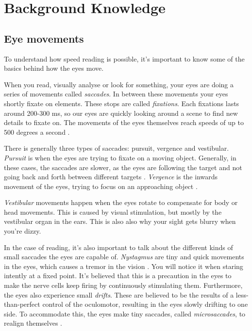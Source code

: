 \section{\fontsize{12}{15}\selectfont Background Knowledge}

\subsection{Eye movements}\label{eye}
To understand how speed reading is possible, it's important to know some of the basics behind how the eyes move.

When you read, visually analyse or look for something, your eyes are doing a series of movements called \textit{saccades}. In between these movements your eyes shortly fixate on elements. These stops are called \textit{fixations}. Each fixations lasts around 200-300 ms, so our eyes are quickly looking around a scene to find new details to fixate on. The movements of the eyes themselves reach speeds of up to 500 degrees a second \cite{eyeMovement}.

There is generally three types of saccades: pursuit, vergence and vestibular. \textit{Pursuit} is when the eyes are trying to fixate on a moving object. Generally, in these cases, the saccades are slower, as the eyes are following the target and not going back and forth between different targets \cite{eyeMovement}.
\textit{Vergence} is the inwards movement of the eyes, trying to focus on an approaching object \cite{eyeMovement}.

\textit{Vestibular} movements happen when the eyes rotate to compensate for body or head movements. This is caused by visual stimulation, but mostly by the vestibular organ in the ears. This is also also why your sight gets blurry when you're dizzy.

In the case of reading, it's also important to talk about the different kinds of small saccades the eyes are capable of. \textit{Nystagmus} are tiny and quick movements in the eyes, which causes a tremor in the vision \cite{eyeMovement}. You will notice it when staring intently at a fixed point. It's believed that this is a precaution in the eyes to make the nerve cells keep firing by continuously stimulating them. Furthermore, the eyes also experience small \textit{drifts}. These are believed to be the results of a less-than-perfect control of the oculomotor, resulting in the eyes slowly drifting to one side. To accommodate this, the eyes make tiny saccades, called \textit{microsaccades}, to realign themselves \cite{eyeMovement}.

